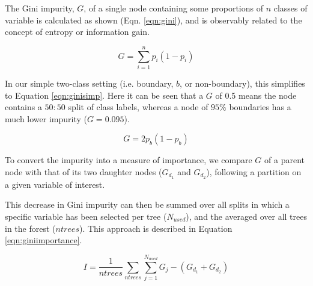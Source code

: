 \documentclass[a4paper,11pt,oneside]{book}
\begin{document}
The Gini impurity, $G$, of a single node containing some proportions of $n$ classes of variable is calculated as shown (Eqn. \ref{eqn:gini}), and is observably related to the concept of entropy or information gain. 

\begin{equation}\label{eqn:gini}
G = \sum_{i=1}^{n} p_i(1-p_i)
\end{equation}

In our simple two-class setting (i.e. boundary, $b$, or non-boundary), this simplifies to Equation \ref{eqn:ginisimp}. Here it can be seen that a $G$ of 0.5 means the node contains a $50:50$ split of class labels, whereas a node of $95\%$ boundaries has a much lower impurity ($G = 0.095$).

\begin{equation}\label{eqn:ginisimp}
G =  2p_{b} (1-p_{b})
\end{equation}

To convert the impurity into a measure of importance, we compare $G$ of a parent node with that of its two daughter nodes ($G_{d_1}$ and $G_{d_2}$), following a partition on a given variable of interest. %

This decrease in Gini impurity can then be summed over all splits in which a specific variable has been selected per tree ($N_{used}$), and the averaged over all trees in the forest ($ntrees$). This approach is described in Equation \ref{eqn:giniimportance}.


\begin{equation}\label{eqn:giniimportance}
I = \frac{1}{ntrees} \sum_{ntrees} \sum_{j=1}^{N_{used}} G_{j} - (G_{d_1} + G_{d_2})
\end{equation}
\end{document}
